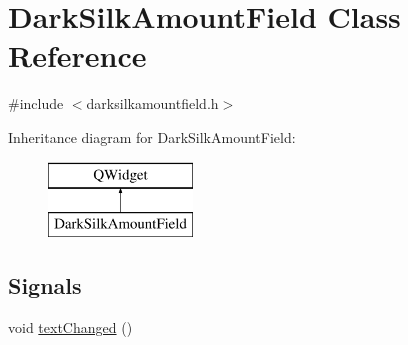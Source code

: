 \hypertarget{class_dark_silk_amount_field}{}\section{Dark\+Silk\+Amount\+Field Class Reference}
\label{class_dark_silk_amount_field}


{\ttfamily \#include $<$darksilkamountfield.\+h$>$}

Inheritance diagram for Dark\+Silk\+Amount\+Field\+:\begin{figure}[H]
\begin{center}
\leavevmode
\includegraphics[height=2.000000cm]{class_dark_silk_amount_field}
\end{center}
\end{figure}
\subsection*{Signals}
\begin{DoxyCompactItemize}
\item 
void \hyperlink{class_dark_silk_amount_field_a6bd63f434fb379d15e9f7ceb49dc32a4}{text\+Changed} ()
\end{DoxyCompactItemize}
